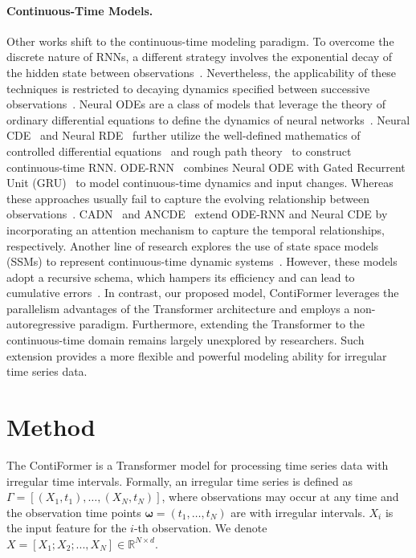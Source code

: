 \documentclass{article}
\begin{document}
\paragraph{Continuous-Time Models.} 
Other works shift to the continuous-time modeling paradigm.
To overcome the discrete nature of RNNs, 
a different strategy involves the exponential decay of the hidden state between observations~\cite{che2018recurrent, mei2017neural}. 
Nevertheless, the applicability of these techniques is restricted to decaying dynamics specified between successive observations~\cite{chen2018neural}. 
Neural ODEs are a class of models that leverage the theory of ordinary differential equations to define the dynamics of neural networks~\cite{chen2018neural, jia2019neural}.
Neural CDE~\cite{kidger2020neural} and Neural RDE~\cite{morrill2021neural} further utilize the well-defined mathematics of controlled differential equations~\cite{arribas2018derivatives, kidger2019deep} and rough path theory~\cite{boutaib2013dimension} to construct continuous-time RNN. 
ODE-RNN~\cite{rubanova2019latent} combines Neural ODE with Gated Recurrent Unit (GRU)~\cite{cho2014properties} to model continuous-time dynamics and input changes.
Whereas these approaches usually fail to capture the evolving relationship between observations~\cite{schirmer2022modeling}. CADN~\cite{chien2022learning} and ANCDE~\cite{jhin2023attentive} extend ODE-RNN and Neural CDE by incorporating an attention mechanism to capture the temporal relationships, respectively.
Another line of research explores the use of state space models (SSMs) to represent continuous-time dynamic systems~\cite{gu2021efficiently, smith2022simplified, gu2022parameterization,ansari2023neural}. However, these models adopt a recursive schema, which hampers its efficiency and can lead to cumulative errors~\cite{chen2018neural}.
In contrast, our proposed model, ContiFormer leverages the parallelism advantages of the Transformer architecture and employs a non-autoregressive paradigm. 
Furthermore, extending the Transformer to the continuous-time domain remains largely unexplored by researchers. Such extension provides a more flexible and powerful modeling ability for irregular time series data.

\section{Method}

The ContiFormer is a Transformer \cite{vaswani2017attention} model for processing time series data with irregular time intervals. 
Formally, an irregular time series is defined as $\Gamma=[(X_1, t_1), \ldots, (X_N, t_N)]$, where observations may occur at any time and the observation time points $\boldsymbol{\omega}=(t_1, \ldots, t_N)$ are with irregular intervals. $X_i$ is the input feature for the $i$-th observation.
We denote $X=[X_1; X_2; ..., X_N] \in \mathbb{R}^{N \times d}$.
\end{document}
